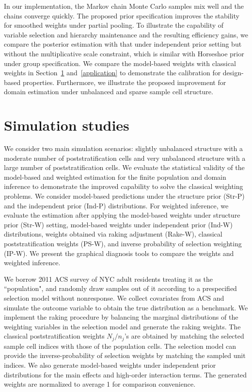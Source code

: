 \documentclass[11pt]{article}
\begin{document}
In our implementation, the Markov chain Monte Carlo samples mix well and the chains converge quickly. The proposed prior specification improves the stability for smoothed weights under partial pooling. To illustrate the capability of variable selection and hierarchy maintenance and the resulting efficiency gains, we compare the posterior estimation with that under independent prior setting but without the multiplicative scale constraint, which is similar with Horseshoe prior under group specification. We  compare the model-based weights with classical weights in Section~\ref{simulation} and~\ref{application} to demonstrate the calibration for design-based properties. Furthermore, we illustrate the proposed improvement for domain estimation under unbalanced and sparse sample cell structure. 


\section{Simulation studies}
\label{simulation}

We consider two main simulation scenarios: slightly unbalanced structure with a moderate number of poststratification cells and very unbalanced structure with a large number of poststratification cells. We evaluate the statistical validity of the model-based and weighted estimation for the finite population and domain inference to demonstrate the improved capability to solve the classical weighting problems. We consider model-based predictions under the structure prior (Str-P) and the independent prior (Ind-P) distributions. For weighted inference, we evaluate the estimation after applying the model-based weights under structure prior (Str-W) setting, model-based weights under independent prior (Ind-W) distributions, weights obtained via raking adjustment (Rake-W), classical poststratification weights (PS-W), and inverse probability of selection weighting (IP-W). We present the graphical diagnosis tools to compare the weights and weighted inference.

We borrow 2011 ACS survey of NYC adult residents treating it as the ``population", and randomly draw samples out of it according to a prespecified selection model without nonresponse. We collect covariates from ACS and simulate the outcome variable to obtain the true distribution as a benchmark. We implement the raking procedure by balancing the marginal distributions of the weighting variables in the selection model and generate the raking weights. The classical poststratification weights $N_j/n_j$'s are obtained by matching the selected sample cell indices with those of the population cells. The selection model can provide the inverse-probability of selection weights by matching the sampled unit indices. We also generate model-based weights under independent prior distributions for the main effects and high-order interaction terms. The generated weights are normalized to average 1 for comparison convenience. 
\end{document}
